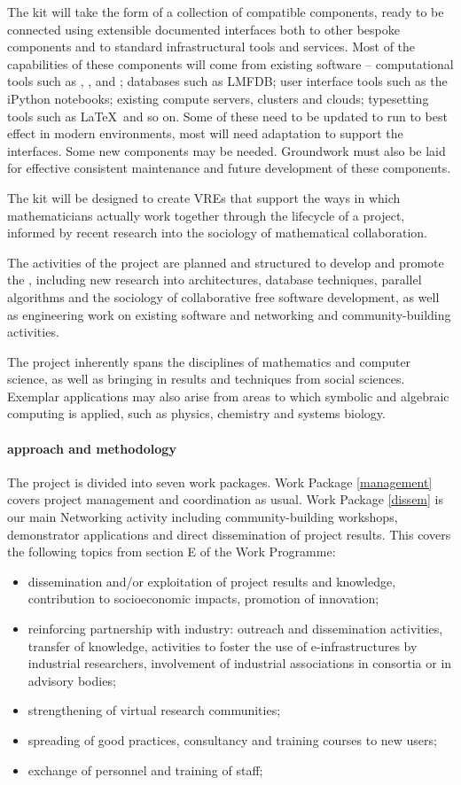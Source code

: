 The kit will take the form of a collection of compatible
components, ready to be connected using extensible documented
interfaces both to other bespoke components and to standard
infrastructural tools and services. Most of the capabilities of these
components will come from existing software -- computational tools
such as \Sage, \GAP, \Singular and \Pari; databases such as LMFDB;
user interface tools such as the iPython notebooks; existing compute
servers, clusters and clouds; typesetting tools such as \LaTeX\ and so
on. Some of these need to be updated to run to best effect in modern
environments, most will need adaptation to support the \TheProject
interfaces. Some new components may be needed. Groundwork must also be
laid for effective consistent maintenance and future development of
these components.

The kit will be designed to create VREs that support the ways in
which mathematicians actually work together through the lifecycle of a
project, informed by recent research into the sociology of
mathematical collaboration. 
 

The activities of the project are planned and structured to develop
and promote the \TheProject, including new research into
architectures, database techniques, parallel algorithms and the
sociology of collaborative free software development, as well as
engineering work on existing software and networking and
community-building activities.

The project inherently spans the disciplines of mathematics and
computer science, as well as bringing in results and techniques from
social sciences. Exemplar applications may also arise from areas to
which symbolic and algebraic computing is applied, such as physics,
chemistry and systems biology.

\paragraph{approach and methodology}

The project is divided into seven work packages. Work Package
\ref{management} covers project management and coordination as
usual. Work Package \ref{dissem} is our main Networking activity
including community-building workshops, demonstrator applications and
direct dissemination of project results.
This covers the following topics from section E of the Work Programme:
\begin{itemize}
\item  dissemination and/or exploitation of project results and knowledge, contribution to socioeconomic
impacts, promotion of innovation;
\item reinforcing partnership with industry: outreach and dissemination activities, transfer of
knowledge, activities to foster the use of e-infrastructures by industrial researchers,
involvement of industrial associations in consortia or in advisory bodies;
\item strengthening of virtual research communities;
\item  spreading of good practices, consultancy and training courses to new users;
\item exchange of personnel and training of staff;
\end{itemize}

